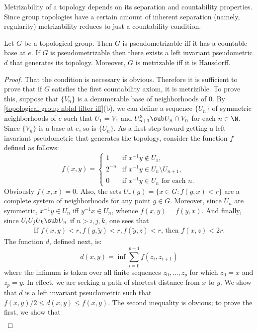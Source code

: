 Metrizability of a topology depends on its separation and countability
properties. Since group topologies have a certain amount of inherent separation (namely, regularity) metrizability reduces to just a countability condition.
\begin{theorem}\label{topological group pseudometrizable iff}
Let $G$ be a topological group. Then $G$ is pseudometrizable iff it has a countable base at $e$. If $G$ is pseudometrizable then there exists a left invariant pseudometric $d$ that generates its topology. Moreover, $G$ is metrizable iff it is Hausdorff.
\end{theorem}
\begin{proof}
That the condition is necessary is obvious. Therefore it is sufficient to prove that if $G$ satisfies the first countability axiom, it is metrizible. To prove this, suppose that $\{V_n\}$ is a denumerable base of neighborhoods of $0$. By \cref{topological group nbhd filter iff}(b), we can define a sequence $\{U_n\}$ of symmetric neighborhoods of $e$ such that $U_1=V_1$ and $U_{n+1}^3\sub U_n\cap V_n$ for each $n\in\N$. Since $\{V_n\}$ is a base at $e$, so is $\{U_n\}$. As a first step toward getting a left invariant pseudometric that generates the topology, consider the function $f$ defined as follows:
\[f(x,y)=\begin{cases}
1&\text{if }x^{-1}y\notin U_1,\\
2^{-n}&\text{if $x^{-1}y\in U_{n}\setminus U_{n+1}$},\\
0&\text{if $x^{-1}y\in U_n$ for each $n$}.
\end{cases}\]
Obviously $f(x,x)=0$. Also, the sets $U_r(g)=\{x\in G:f(g,x)<r\}$ are a
complete system of neighborhoods for any point $g\in G$. Moreover, since $U_n$ are symmetric, $x^{-1}y\in U_n$ iff $y^{-1}x\in U_n$, whence $f(x,y)=f(y,x)$. And finally, since $U_{i}U_jU_k\sub U_n$ if $n>i,j,k$, one sees that
\begin{align}\label{topological group pseudometrizable iff-1}
\text{If $f(x,y)<r,f(y,\tilde{y})<r,f(\tilde{y},z)<r$, then $f(x,z)<2r$}.
\end{align}
The function $d$, defined next, is:
\[d(x,y)=\inf\sum_{i=0}^{p-1}f(z_i,z_{i+1})\]
where the infimum is taken over all finite sequences $z_0,\dots,z_p$ for which $z_0=x$ and $z_p=y$. In effect, we are seeking a path of shortest distance from $x$ to $y$. We show that $d$ is a left invariant pseuclometric such that $f(x,y)/2\leq d(x,y)\leq f(x,y)$. The second inequality is obvious; to prove the first, we show that
\begin{align}\label{topological group pseudometrizable iff-2}

\end{align}
\end{proof}
